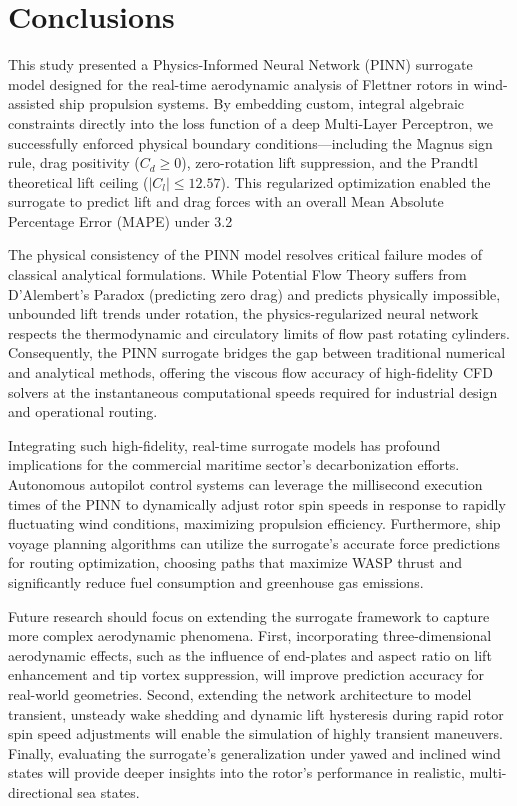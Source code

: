 \documentclass[aip,pof,reprint,onecolumn,amsmath,amssymb,graphicx,longbibliography]{revtex4-2}
\begin{document}
\section{\label{sec:conclusion}Conclusions}
This study presented a Physics-Informed Neural Network (PINN) surrogate model designed for the real-time aerodynamic analysis of Flettner rotors in wind-assisted ship propulsion systems. By embedding custom, integral algebraic constraints directly into the loss function of a deep Multi-Layer Perceptron, we successfully enforced physical boundary conditions—including the Magnus sign rule, drag positivity ($C_d \ge 0$), zero-rotation lift suppression, and the Prandtl theoretical lift ceiling ($|C_l| \le 12.57$). This regularized optimization enabled the surrogate to predict lift and drag forces with an overall Mean Absolute Percentage Error (MAPE) under 3.2%

The physical consistency of the PINN model resolves critical failure modes of classical analytical formulations. While Potential Flow Theory suffers from D'Alembert's Paradox (predicting zero drag) and predicts physically impossible, unbounded lift trends under rotation, the physics-regularized neural network respects the thermodynamic and circulatory limits of flow past rotating cylinders. Consequently, the PINN surrogate bridges the gap between traditional numerical and analytical methods, offering the viscous flow accuracy of high-fidelity CFD solvers at the instantaneous computational speeds required for industrial design and operational routing.

Integrating such high-fidelity, real-time surrogate models has profound implications for the commercial maritime sector's decarbonization efforts. Autonomous autopilot control systems can leverage the millisecond execution times of the PINN to dynamically adjust rotor spin speeds in response to rapidly fluctuating wind conditions, maximizing propulsion efficiency. Furthermore, ship voyage planning algorithms can utilize the surrogate's accurate force predictions for routing optimization, choosing paths that maximize WASP thrust and significantly reduce fuel consumption and greenhouse gas emissions.

Future research should focus on extending the surrogate framework to capture more complex aerodynamic phenomena. First, incorporating three-dimensional aerodynamic effects, such as the influence of end-plates and aspect ratio on lift enhancement and tip vortex suppression, will improve prediction accuracy for real-world geometries. Second, extending the network architecture to model transient, unsteady wake shedding and dynamic lift hysteresis during rapid rotor spin speed adjustments will enable the simulation of highly transient maneuvers. Finally, evaluating the surrogate's generalization under yawed and inclined wind states will provide deeper insights into the rotor's performance in realistic, multi-directional sea states.
\end{document}
